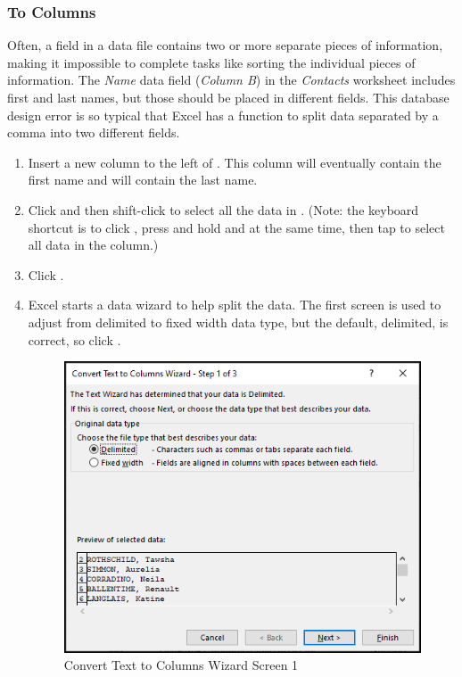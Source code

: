 \subsubsection{To Columns}

Often, a field in a data file contains two or more separate pieces of information, making it impossible to complete tasks like sorting the individual pieces of information. The \textit{Name} data field (\textit{Column B}) in the \textit{Contacts} worksheet includes first and last names, but those should be placed in different fields. This database design error is so typical that Excel has a function to split data separated by a comma into two different fields.

\begin{enumbox}
	\begin{enumerate}
		\item Insert a new column to the left of . This column will eventually contain the first name and  will contain the last name.
		\item Click  and then shift-click  to select all the data in . (Note: the keyboard shortcut is to click , press and hold  and  at the same time, then tap  to select all data in the column.)
		\item Click .
		\item Excel starts a data wizard to help split the data. The first screen is used to adjust from delimited to fixed width data type, but the default, delimited, is correct, so click .
		
		\begin{figure}[H]
			\centering
			\includegraphics[width=\maxwidth{.75\linewidth}]{gfx/ch09_fig30}
			\caption{Convert Text to Columns Wizard Screen 1}
			\label{09:fig30}
		\end{figure}
	

\end{enumerate}
\end{enumbox}
